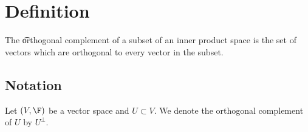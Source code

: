 

\section*{Definition}

The \t{orthogonal complement} of a subset of an inner product space is the set of vectors which are orthogonal to every vector in the subset.

\subsection*{Notation}

Let $(V, \F )$ be a vector space and $U \subset V$.
We denote the orthogonal complement of $U$ by $U^{\perp}$.

\blankpage